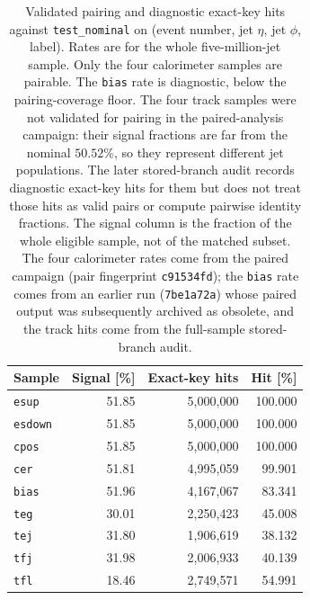\documentclass[pdflatex,sn-mathphys,Numbered,iicol]{sn-jnl}
\begin{document}
\begin{table}[t]
\centering\small
\caption{Validated pairing and diagnostic exact-key hits against
  \texttt{test\_nominal} on (event number, jet $\eta$, jet $\phi$, label). Rates are
  for the whole five-million-jet sample. Only the four calorimeter samples are
  pairable. The \texttt{bias} rate is diagnostic, below the pairing-coverage floor.
  The four track samples were not validated for pairing in the paired-analysis
  campaign: their signal fractions are far from the nominal $50.52\%$, so they
  represent different jet populations. The later stored-branch audit records
  diagnostic exact-key hits for them but does not treat those hits as valid pairs
  or compute pairwise identity fractions. The signal column is the fraction of the
  whole eligible sample, not of the matched subset. The four calorimeter rates come
  from the paired campaign (pair fingerprint \texttt{c91534fd}); the \texttt{bias}
  rate comes from an earlier run (\texttt{7be1a72a}) whose paired output was
  subsequently archived as obsolete, and the track hits come from the full-sample
  stored-branch audit.}
\label{tab:pairing}
\begin{tabular}{lrrr}
\toprule
Sample & Signal [\%] & Exact-key hits & Hit [\%] \\
\midrule
\texttt{esup}   & 51.85 & 5{,}000{,}000 & 100.000 \\
\texttt{esdown} & 51.85 & 5{,}000{,}000 & 100.000 \\
\texttt{cpos}   & 51.85 & 5{,}000{,}000 & 100.000 \\
\texttt{cer}    & 51.81 & 4{,}995{,}059 &  99.901 \\
\midrule
\texttt{bias}   & 51.96 & 4{,}167{,}067 &  83.341 \\
\midrule
\texttt{teg}    & 30.01 & 2{,}250{,}423 & 45.008 \\
\texttt{tej}    & 31.80 & 1{,}906{,}619 & 38.132 \\
\texttt{tfj}    & 31.98 & 2{,}006{,}933 & 40.139 \\
\texttt{tfl}    & 18.46 & 2{,}749{,}571 & 54.991 \\
\bottomrule
\end{tabular}
\end{table}
\end{document}
